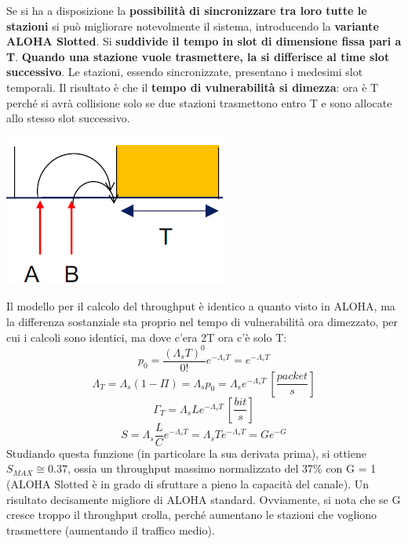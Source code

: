 \documentclass[12pt]{article}
\begin{document}
Se si ha a disposizione la \textbf{possibilità di sincronizzare tra loro tutte le stazioni} si può migliorare notevolmente il sistema, introducendo la \textbf{variante ALOHA Slotted}. Si \textbf{suddivide il tempo in slot di dimensione fissa pari a T}. \textbf{Quando una stazione vuole trasmettere, la si differisce al time slot successivo}. Le stazioni, essendo sincronizzate, presentano i medesimi slot temporali. Il risultato è che il \textbf{tempo di vulnerabilità si dimezza}: ora è T perché si avrà collisione solo se due stazioni trasmettono entro T e sono allocate allo stesso slot successivo.
\begin{center}
    \includegraphics[scale=0.5]{aloha_slotted_collision}
\end{center}
Il modello per il calcolo del throughput è identico a quanto visto in ALOHA, ma la differenza sostanziale sta proprio nel tempo di vulnerabilità ora dimezzato, per cui i calcoli sono identici, ma dove c'era 2T ora c'è solo T:
\begin{equation*}
    p_0 = \frac{(\Lambda_sT)^0}{0!}e^{-\Lambda_sT} = e^{-\Lambda_sT}
\end{equation*}
\begin{equation*}
    \Lambda_T = \Lambda_s(1 - \Pi) = \Lambda_s p_0 = \Lambda_se^{-\Lambda_sT}\  \left[\frac{packet}{s}\right]
\end{equation*}
\begin{equation*}
    \Gamma_T = \Lambda_sLe^{-\Lambda_sT}\ \left[\frac{bit}{s}\right]
\end{equation*}
\begin{equation*}
    S = \Lambda_s\frac{L}{C}e^{-\Lambda_sT} = \Lambda_s T e^{-\Lambda_sT} = Ge^{-G}
\end{equation*}
Studiando questa funzione (in particolare la sua derivata prima), si ottiene $S_{MAX} \cong 0.37$, ossia un throughput massimo normalizzato del 37\% con G = 1 (ALOHA Slotted è in grado di sfruttare a pieno la capacità del canale). Un risultato decisamente migliore di ALOHA standard. Ovviamente, si nota che se G cresce troppo il throughput crolla, perché aumentano le stazioni che vogliono trasmettere (aumentando il traffico medio).
\end{document}

